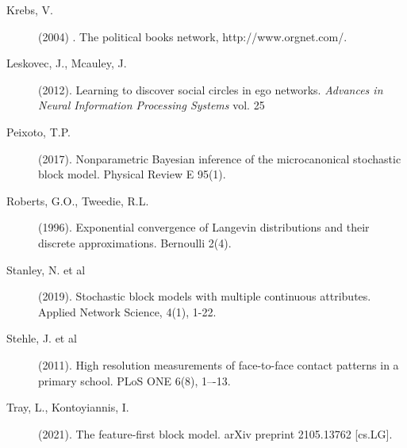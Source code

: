 
\begin{description}
	
	\item[Krebs, V.] (2004) . The political books network,
	http://www.orgnet.com/.

	\item[Leskovec, J., Mcauley, J.] (2012).
	Learning to discover social circles in ego networks.
	{\it Advances in Neural Information Processing Systems} vol. 25

	\item[Peixoto, T.P.] (2017).
	Nonparametric Bayesian inference of the microcanonical
	stochastic block model. Physical Review E 95(1).

	\item[Roberts, G.O., Tweedie, R.L.] (1996).
	Exponential convergence of Langevin distributions and their discrete approximations.
	Bernoulli 2(4).

	\item[Stanley, N. et al] (2019). Stochastic block models with multiple continuous attributes. Applied Network Science, 4(1), 1-22.

	\item[Stehle, J. et al] (2011).
	High resolution measurements of face-to-face contact patterns in a primary school.
	PLoS ONE 6(8), 1–-13.

	\item[Tray, L., Kontoyiannis, I.] (2021).
	The feature-first block model.
	arXiv preprint 2105.13762 [cs.LG].

\end{description}

